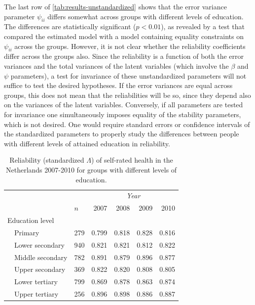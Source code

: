 \documentclass[a4paper,11pt]{article}
\newcommand{\0}{\boldsymbol{0}}
\begin{document}
The last row of \ref{tab:results-unstandardized} shows that the error variance parameter $\psi_{ii}$ 
differs somewhat across groups with different levels of education. The differences are statistically
significant ($p < 0.01$), as revealed by a test that compared the estimated model with a model 
containing equality constraints on $\psi_{ii}$ across the groups. However, it is not clear whether 
the reliability coefficients differ across the groups also.
Since the reliability is a function of both the error variances and the total variances of the latent variables (which involve the 
$\beta$ and $\psi$ parameters), a test for invariance of these unstandardized parameters will not suffice to test the desired hypotheses. 
If the error variances are equal across groups, this does not mean that the reliabilities will be so, since they depend also on the
variances of the latent variables. Conversely, if all parameters are tested for invariance one simultaneously imposes equality of the
stability parameters, which is not desired.
One would require standard errors or confidence intervals of the standardized parameters to properly study the differences between people with different levels of attained education in reliability.



\begin{table}[bth]
\begin{center}\begin{small}
\begin{tabular}{lllrrrr}  \hline  \hline
&&&  \multicolumn{4}{c}{\emph{Year}}\\\cline{4-7}
&&$n$& 2007&2008&2009&2010\\
  \hline
  \multicolumn{2}{l}{Education level}\\
& Primary	   & 279  & 0.799 & 0.818 & 0.828 & 0.816 \\ 
& Lower secondary  & 940  & 0.821 & 0.821 & 0.812 & 0.822 \\ 
& Middle secondary & 782  & 0.891 & 0.879 & 0.896 & 0.877 \\ 
& Upper secondary  & 369  & 0.822 & 0.820 & 0.808 & 0.805 \\ 
& Lower tertiary   & 799  & 0.869 & 0.878 & 0.863 & 0.874 \\ 
& Upper tertiary   & 256  & 0.896 & 0.898 & 0.886 & 0.887 \\ 
  \hline     \hline
\end{tabular}
\caption{Reliability (standardized $\Lambda$) of self-rated health in the Netherlands 2007-2010 for groups with different levels of education.}\label{tab:first-results}\end{small}
\end{center}
\end{table}
\end{document}
